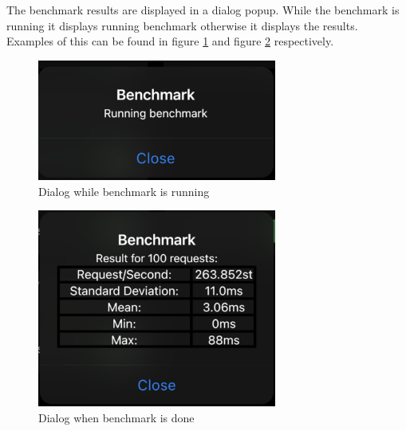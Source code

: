 The benchmark results are displayed in a dialog popup. While the benchmark is running it displays running benchmark otherwise it displays the results. Examples of this can be found in figure \ref{fig:appBenchRun} and figure \ref{fig:appBenchRes} respectively. 

\begin{figure}[H]
    \centering
    \includegraphics[width=0.7\textwidth]{img/becnhrun.png} 
    \caption{Dialog while benchmark is running}
    \label{fig:appBenchRun}
\end{figure}

\begin{figure}[H]
    \centering
    \includegraphics[width=0.7\textwidth]{img/becnhdone.png} 
    \caption{Dialog when benchmark is done}
    \label{fig:appBenchRes}
\end{figure}
